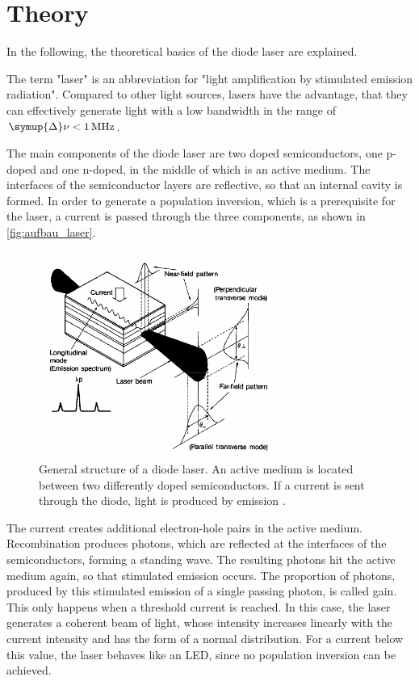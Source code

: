 \section{Theory}
\label{sec:theorie}

In the following, the theoretical basics of the diode laser are explained.

The term "laser" is an abbreviation for "light amplification by stimulated emission radiation".
Compared to other light sources, lasers have the advantage,
that they can effectively generate light with a low bandwidth in the range of $\symup{\Delta}\nu < \SI{1}{\mega\hertz}$.

The main components of the diode laser are two doped semiconductors,
one p-doped and one n-doped,
in the middle of which is an active medium.
The interfaces of the semiconductor layers are reflective,
so that an internal cavity is formed.
In order to generate a population inversion,
which is a prerequisite for the laser,
a current is passed through the three components,
as shown in \autoref{fig:aufbau_laser}.
\begin{figure}
    \centering
    \includegraphics[width=0.7\textwidth]{content/img/p6_Fig2.png}
    \caption{General structure of a diode laser.
    An active medium is located between two differently doped semiconductors.
    If a current is sent through the diode, light is produced by emission \cite{versuchsanleitung}.}
    \label{fig:aufbau_laser}
\end{figure}
The current creates additional electron-hole pairs in the active medium.
Recombination produces photons,
which are reflected at the interfaces of the semiconductors,
forming a standing wave.
The resulting photons hit the active medium again,
so that stimulated emission occurs.
The proportion of photons,
produced by this stimulated emission of a single passing photon,
is called gain.
This only happens when a threshold current is reached.
In this case, the laser generates a coherent beam of light,
whose intensity increases linearly with the current intensity and has the form of a normal distribution.
For a current below this value, the laser behaves like an LED,
since no population inversion can be achieved.

